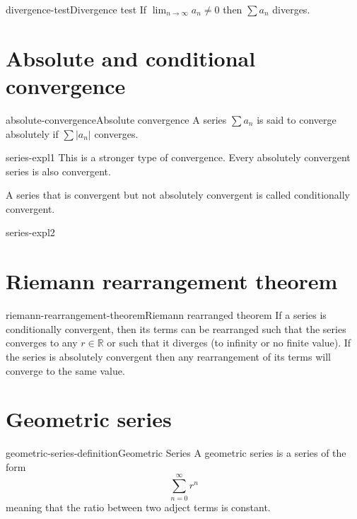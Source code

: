 \documentclass[preview]{standalone}
\begin{document}
\begin{snippettheorem}{divergence-test}{Divergence test}{
    If \(\lim_{n \to \infty} a_n \neq 0\) then \(\sum a_n\) diverges.
}
\end{snippettheorem}

\section{Absolute and conditional convergence}

\begin{snippetdefinition}{absolute-convergence}{Absolute convergence}{
    A series \(\sum a_n\) is said to converge absolutely if
    \(\sum |a_n|\) converges.
}
\end{snippetdefinition}

\begin{snippet}{series-expl1}
This is a stronger type of convergence. Every absolutely convergent series is also convergent.

A series that is convergent but not absolutely convergent is called conditionally convergent.
\end{snippet}{series-expl2}

\section{Riemann rearrangement theorem}

\begin{snippettheorem}{riemann-rearrangement-theorem}{Riemann rearranged theorem}{
    If a series is conditionally convergent, then its terms can be rearranged such that
    the series converges to any \(r\in \mathbb{R}\) or such that it diverges (to infinity or no finite value).
    If the series is absolutely convergent then any rearrangement of its terms will converge to the same value.
}
\end{snippettheorem}

\section{Geometric series}

\begin{snippetdefinition}{geometric-series-definition}{Geometric Series}{
    A geometric series is a series of the form
    \[
        \sum_{n=0}^\infty r^n
    \]
    meaning that the ratio between two adject terms is constant.
}
\end{snippetdefinition}
\end{document}
